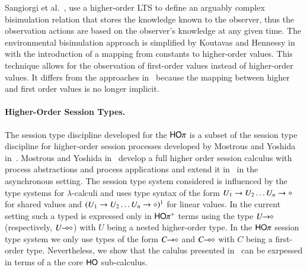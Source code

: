 

Sangiorgi et al.~\cite{DBLP:conf/lics/SangiorgiKS07}, use a higher-order LTS 
to define an arguably complex bisimulation relation that stores the knowledge known to
the observer, thus the observation actions are based on the observer's knowledge
at any given time. 
The environmental bisimulation approach is simplified by Koutavas and
Hennessy in~\cite{DBLP:journals/cl/KoutavasH12,DBLP:conf/esop/KoutavasH11}
with the introduction
of a mapping from constants to higher-order values. This
technique allows for the observation of first-order values instead
of higher-order values. It differs from the approaches
in~\cite{San96H,JeffreyR05} because the
mapping between higher and first order values is no longer implicit.

\paragraph{Higher-Order Session Types.}
The session type discipline developed for the $\mathsf{HO}\pi$ is a subset
of the session type discipline
for higher-order session processes developed by Mostrous and Yoshida
in~\cite{tlca07,mostrous09sessionbased}.
Mostrous and Yoshida in~\cite{tlca07} develop a full higher order session calculus
with process abstractions and process applications and extend it
in~\cite{mostrous09sessionbased} in the asynchronous setting.
The session type
system considered is influenced by the type systems for $\lambda$-calculi and
uses type syntax of the form $U_1 \rightarrow U_2 \dots U_n \rightarrow \diamond$
for shared values and $(U_1 \rightarrow U_2 \dots U_n \rightarrow \diamond)^{1}$
for linear values.
In the current setting such a typed is expressed only in $\mathsf{HO\pi^{+}}$
terms using the type $U\!\! \rightarrow\!\! \diamond$ (respectively, $U\!\! \multimap\!\! \diamond$)
with $U$ being a nested higher-order type.
In the $\mathsf{HO}\pi$ session type system we only use types of the form
$C\!\! \rightarrow\!\! \diamond$ and $C\!\! \multimap\!\! \diamond$ with $C$ being a first-order type.
Nevertheless, we show that
the calulus presented in~\cite{tlca07} can be exrpessed in terms of a the
core $\mathsf{HO}$ sub-calculus.



